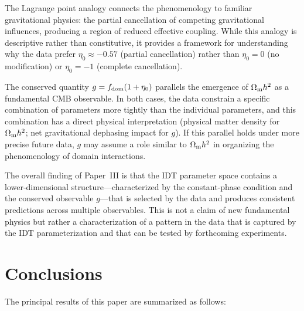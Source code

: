 \documentclass[aps,prd,twocolumn,superscriptaddress,nofootinbib]{revtex4-2}
\newcommand{\Om}{\Omega_{\rm m}}
\newcommand{\fdom}{f_{\rm dom}}
\newcommand{\etaz}{\eta_0}
\begin{document}
The Lagrange point analogy connects the phenomenology to familiar
gravitational physics: the partial cancellation of competing
gravitational influences, producing a region of reduced effective
coupling. While this analogy is descriptive rather than constitutive,
it provides a framework for understanding why the data prefer
$\etaz \approx -0.57$ (partial cancellation) rather than $\etaz = 0$
(no modification) or $\etaz = -1$ (complete cancellation).

The conserved quantity $g = \fdom(1 + \etaz)$ parallels the emergence
of $\Om h^2$ as a fundamental CMB observable. In both cases, the data
constrain a specific combination of parameters more tightly than the
individual parameters, and this combination has a direct physical
interpretation (physical matter density for $\Om h^2$; net
gravitational dephasing impact for $g$). If this parallel holds under
more precise future data, $g$ may assume a role similar to $\Om h^2$
in organizing the phenomenology of domain interactions.

The overall finding of Paper~III is that the IDT parameter space
contains a lower-dimensional structure---characterized by the
constant-phase condition and the conserved observable $g$---that is
selected by the data and produces consistent predictions across
multiple observables. This is not a claim of new fundamental physics
but rather a characterization of a pattern in the data that is
captured by the IDT parameterization and that can be tested by
forthcoming experiments.

\section{Conclusions}
\label{sec:conclusions}

The principal results of this paper are summarized as follows:
\end{document}
